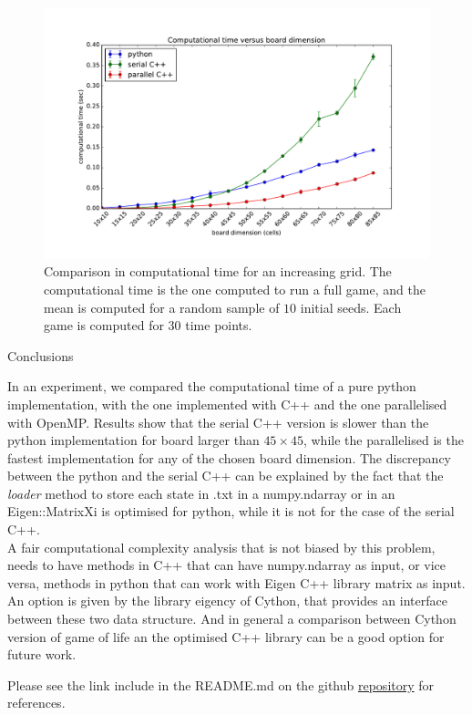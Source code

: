 \documentclass[11pt, twoside]{article}
\begin{document}
\begin{figure}
	\centering
	\includegraphics[scale=0.55]{figures/figure_1.pdf}
	\caption{Comparison in computational time for an increasing grid. The computational time is the one computed to run a full game, and the mean is computed for a random sample of $10$ initial seeds. Each game is computed for $30$ time points.}
	\label{fig:graph}
\end{figure}




\begin{center}
	\color{MidnightBlue} {\Large Conclusions}\color{Black} 
\end{center}

\noindent
In an experiment, we compared the computational time of a pure python implementation, with the one implemented with C++ and the one parallelised with OpenMP. Results show that the serial C++ version is slower than the python implementation for board larger than $45\times 45$, while the parallelised is the fastest implementation for any of the chosen board dimension.
The discrepancy between the python and the serial C++ can be explained by the fact that the \emph{loader} method to store each state in .txt in a numpy.ndarray or in an Eigen::MatrixXi is optimised for python, while it is not for the case of the serial C++.\\

\noindent
A fair computational complexity analysis that is not biased by this problem, needs to have methods in C++ that can have numpy.ndarray as input, or vice versa, methods in python that can work with Eigen C++ library matrix as input.
An option is given by the library eigency of Cython, that provides an interface between these two data structure. And in general a comparison between Cython version of game of life an the optimised C++ library can be a good option for future work.


\vspace{1cm}
\noindent
Please see the link include in the README.md on the github \href{https://github.com/SebastianoF/game_of_life}{repository} for references.
\end{document}
